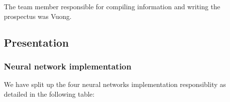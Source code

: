 \documentclass[letterpaper, 10 pt, conference]{ieeeconf}  %
\begin{document}
        \begin{table}[h!] \centering
            \caption{Datasets}
            \begin{threeparttable}
            \end{threeparttable}
        \end{table}
    
        The team member responsible for compiling information and writing the prospectus was Vuong.

    \subsection{Presentation}
        \subsubsection{Neural network implementation} We have split up the four neural networks implementation responsiblity as detailed in the following table:
            \begin{table}[h!] \centering
                \caption{Network and their implementer}
                \begin{threeparttable}
                \end{threeparttable}
            \end{table}
\end{document}
